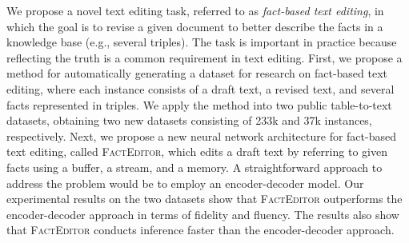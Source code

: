 We propose a novel text editing task, referred to as \textit{fact-based text editing}, in which the goal is to revise a given document to better describe the facts in a knowledge base (e.g., several triples). The task is important in practice because reflecting the truth is a common requirement in text editing. First, we propose a method for automatically generating a dataset for research on fact-based text editing, where each instance consists of a draft text, a revised text, and several facts represented in triples. We apply the method into two public table-to-text datasets, obtaining two new datasets consisting of 233k and 37k instances, respectively. Next, we propose a new neural network architecture for fact-based text editing, called \textsc{FactEditor}, which edits a draft text by referring to given facts using a buffer, a stream, and a memory. A straightforward approach to address the problem would be to employ an encoder-decoder model. Our experimental results on the two datasets show that \textsc{FactEditor} outperforms the encoder-decoder approach in terms of fidelity and fluency. The results also show that \textsc{FactEditor} conducts inference faster than the encoder-decoder approach.

